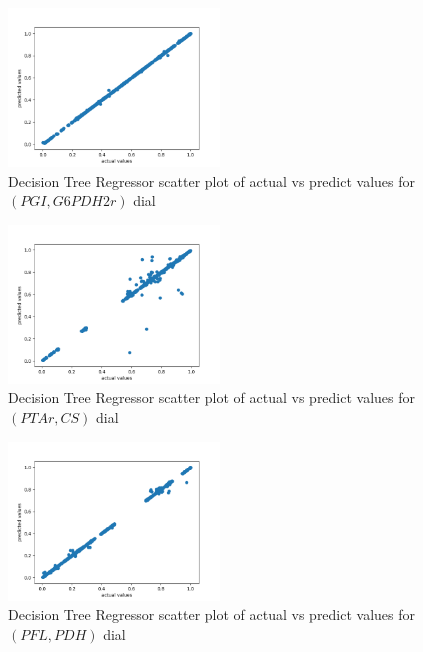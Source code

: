 \documentclass[12pt,chapterheads]{ucsd}
\begin{document}
\begin{figure}[h] 
\centering
\includegraphics[width=0.5\textwidth]{PGI_G6PDH2r_dtr}
\caption[Decision Tree Regressor scatter plot of actual vs predict values for $(PGI, G6PDH2r)$ dial]
{Decision Tree Regressor scatter plot of actual vs predict values for $(PGI, G6PDH2r)$ dial}
\label{fig:PgiG6pdh2rDtr}
\end{figure}

\begin{figure}[h] 
\centering
\includegraphics[width=0.5\textwidth]{PTAr_CS_dtr}
\caption[Decision Tree Regressor scatter plot of actual vs predict values for $(PTAr, CS)$ dial]
{Decision Tree Regressor scatter plot of actual vs predict values for $(PTAr, CS)$ dial}
\label{fig:PtarCsDtr}
\end{figure}

\begin{figure}[h] 
\centering
\includegraphics[width=0.5\textwidth]{PFL_PDH_dtr}
\caption[Decision Tree Regressor scatter plot of actual vs predict values for $(PFL, PDH)$ dial]
{Decision Tree Regressor scatter plot of actual vs predict values for $(PFL, PDH)$ dial}
\label{fig:PflPdhDtr}
\end{figure}
\end{document}

